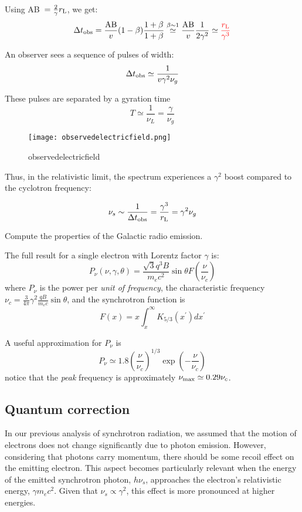 Using AB~$= \frac{2}{\gamma}r_{\rm L}$, we get:
%
\[
\Delta t_{\rm obs} = \frac{\text{AB}}{v} (1-\beta) \frac{1+\beta}{1+\beta} \overset{\beta \sim 1}{\simeq} \frac{\text{AB}}{v} \frac{1}{2\gamma^2} \simeq {\color{red}\frac{r_{\rm L}}{\gamma^3}}
\]

An observer sees a sequence of pulses of width:
%
\[
\Delta t_{\rm obs} \simeq \frac{1}{v \gamma^2 \nu_g} %
\]

These pulses are separated by a gyration time 
%
\[
T \simeq \frac{1}{\nu_L} = \frac{\gamma}{\nu_g}
\]

\begin{figure}[t]
\centering
\texttt{[image: observedelectricfield.png]}
\caption{observedelectricfield}
\end{figure}

Thus, in the relativistic limit, the spectrum experiences a \( \gamma^2 \) boost compared to the cyclotron frequency:
%
\begin{remark}
\[
\nu_s \sim \frac{1}{\Delta t_{\rm obs}} = \frac{\gamma^3}{r_{\rm L}} = \gamma^2 \nu_g
\]
\end{remark}

\begin{problem}
Compute the properties of the Galactic radio emission.
\end{problem}

The full result for a single electron with Lorentz factor \( \gamma \) is:
%
\[
P_\nu(\nu, \gamma, \theta) = \frac{\sqrt 3 q^3 B}{m_e c^2} \sin \theta F\left(\frac{\nu}{\nu_c}\right)
\]
%
where $P_\nu$ is the power per \emph{unit of frequency}, the characteristic frequency $\nu_c = \frac{3}{4\pi} \gamma^2 \frac{qB}{m_e c} \sin \theta$, and the synchrotron function is
%
\[
F(x) = x \int_x^\infty K_{5/3} (x^\prime) dx^\prime
\]

A useful approximation for \( P_\nu \) is 
%
\[
P_\nu \simeq 1.8 \left(\frac{\nu}{\nu_c}\right)^{1/3} \exp\left(-\frac{\nu}{\nu_c}\right)
\]
%
notice that the \emph{peak} frequency is approximately  \( \nu_{\rm max} \simeq 0.29 \nu_c \).

\subsection{Quantum correction}

In our previous analysis of synchrotron radiation, we assumed that the motion of electrons does not change significantly due to photon emission. However, considering that photons carry momentum, there should be some recoil effect on the emitting electron. This aspect becomes particularly relevant when the energy of the emitted synchrotron photon, \( h \nu_s \), approaches the electron's relativistic energy, \( \gamma m_e c^2 \). Given that \( \nu_s \propto \gamma^2 \), this effect is more pronounced at higher energies.

